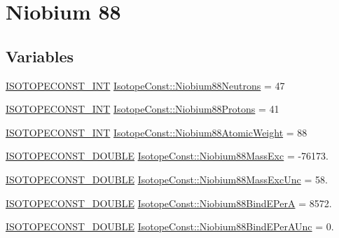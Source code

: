 \hypertarget{group___isotope_const-_niobium-_nb88}{}\section{Niobium 88}
\label{group___isotope_const-_niobium-_nb88}
\subsection*{Variables}
\begin{DoxyCompactItemize}
\item 
\mbox{\hyperlink{group___isotope_const-_macros_ga5f18360b3e99483a35c32d789e62621c}{I\+S\+O\+T\+O\+P\+E\+C\+O\+N\+S\+T\+\_\+\+I\+NT}} \mbox{\hyperlink{group___isotope_const-_niobium-_nb88_ga44ac18dff12fbcb3144ae88362525b23}{Isotope\+Const\+::\+Niobium88\+Neutrons}} = 47
\item 
\mbox{\hyperlink{group___isotope_const-_macros_ga5f18360b3e99483a35c32d789e62621c}{I\+S\+O\+T\+O\+P\+E\+C\+O\+N\+S\+T\+\_\+\+I\+NT}} \mbox{\hyperlink{group___isotope_const-_niobium-_nb88_gac637e8b93224c7bd17a77c908cecb907}{Isotope\+Const\+::\+Niobium88\+Protons}} = 41
\item 
\mbox{\hyperlink{group___isotope_const-_macros_ga5f18360b3e99483a35c32d789e62621c}{I\+S\+O\+T\+O\+P\+E\+C\+O\+N\+S\+T\+\_\+\+I\+NT}} \mbox{\hyperlink{group___isotope_const-_niobium-_nb88_gae45e26972fdbc91314e0d117edb28a58}{Isotope\+Const\+::\+Niobium88\+Atomic\+Weight}} = 88
\item 
\mbox{\hyperlink{group___isotope_const-_macros_ga8f45a7272ce02c0b4c65c44636ed719a}{I\+S\+O\+T\+O\+P\+E\+C\+O\+N\+S\+T\+\_\+\+D\+O\+U\+B\+LE}} \mbox{\hyperlink{group___isotope_const-_niobium-_nb88_ga351d2d60249bb13c50d8f82891ef3196}{Isotope\+Const\+::\+Niobium88\+Mass\+Exc}} = -\/76173.
\item 
\mbox{\hyperlink{group___isotope_const-_macros_ga8f45a7272ce02c0b4c65c44636ed719a}{I\+S\+O\+T\+O\+P\+E\+C\+O\+N\+S\+T\+\_\+\+D\+O\+U\+B\+LE}} \mbox{\hyperlink{group___isotope_const-_niobium-_nb88_ga316b77fd1f5cfd77ff8c89e452b84f92}{Isotope\+Const\+::\+Niobium88\+Mass\+Exc\+Unc}} = 58.
\item 
\mbox{\hyperlink{group___isotope_const-_macros_ga8f45a7272ce02c0b4c65c44636ed719a}{I\+S\+O\+T\+O\+P\+E\+C\+O\+N\+S\+T\+\_\+\+D\+O\+U\+B\+LE}} \mbox{\hyperlink{group___isotope_const-_niobium-_nb88_ga12f14da188d1f93d73be2caff7f74217}{Isotope\+Const\+::\+Niobium88\+Bind\+E\+PerA}} = 8572.
\item 
\mbox{\hyperlink{group___isotope_const-_macros_ga8f45a7272ce02c0b4c65c44636ed719a}{I\+S\+O\+T\+O\+P\+E\+C\+O\+N\+S\+T\+\_\+\+D\+O\+U\+B\+LE}} \mbox{\hyperlink{group___isotope_const-_niobium-_nb88_ga597caf17ae62e96e079217207c5a01d2}{Isotope\+Const\+::\+Niobium88\+Bind\+E\+Per\+A\+Unc}} = 0.

\end{DoxyCompactItemize}
